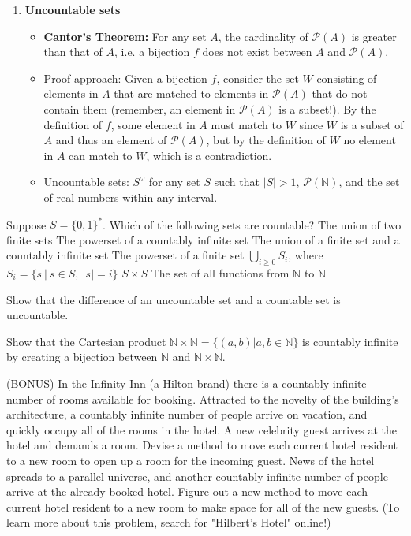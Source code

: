 \documentclass[solution, letterpaper]{cs20inclass}
\begin{document}
\begin{enumerate}
\item \textbf{Uncountable sets}
\begin{itemize}
\item {\bf Cantor's Theorem:} For any set $A$, the cardinality of $\mathcal{P}(A)$ is greater than that of $A$, i.e. a bijection $f$ does not exist between $A$ and $\mathcal{P}(A)$.
\item Proof approach: Given a bijection $f$, consider the set $W$ consisting of elements in $A$ that are matched to elements in $\mathcal{P}(A)$ that do not contain them (remember, an element in $\mathcal{P}(A)$ is a subset!). By the definition of $f$, some element in $A$ must match to $W$ since $W$ is a subset of $A$ and thus an element of $\mathcal{P}(A)$, but by the definition of $W$ no element in $A$ can match to $W$, which is a contradiction.
\item Uncountable sets: $S^\omega$ for any set $S$ such that $|S|>1$, $\mathcal{P}(\mathbb{N})$, and the set of real numbers within any interval.
\end{itemize}

\end{enumerate}
\pagebreak

\problem Suppose $S=\{0,1\}^*$. Which of the following sets are countable?
\subproblem The union of two finite sets
\subproblem The powerset of a countably infinite set
\subproblem The union of a finite set and a countably infinite set
\subproblem The powerset of a finite set
\subproblem $\bigcup_{i\geq 0} S_i$, where $S_i=\{s\ | \ s \in S, \ |s|=i\}$
\subproblem $S \times S$
\subproblem The set of all functions from $\mathbb{N}$ to $\mathbb{N}$

\problem Show that the difference of an uncountable set and a countable set is uncountable.

\problem Show that the Cartesian product $\mathbb{N} \times \mathbb{N} = \{(a,b)|a,b \in \mathbb{N}\}$ is countably infinite by creating a bijection between $\mathbb{N}$ and $\mathbb{N} \times \mathbb{N}$.

\problem (BONUS) In the Infinity Inn (a Hilton brand) there is a countably infinite number of rooms available for booking. Attracted to the novelty of the building's architecture, a countably infinite number of people arrive on vacation, and quickly occupy all of the rooms in the hotel.
\subproblem A new celebrity guest arrives at the hotel and demands a room. Devise a method to move each current hotel resident to a new room to open up a room for the incoming guest.
\subproblem News of the hotel spreads to a parallel universe, and another countably infinite number of people arrive at the already-booked hotel. Figure out a new method to move each current hotel resident to a new room to make space for all of the new guests. (To learn more about this problem, search for "Hilbert's Hotel" online!)
\end{document}
